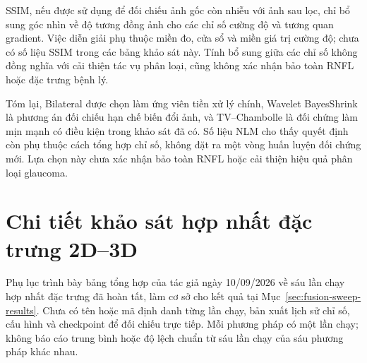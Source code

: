 \documentclass[14pt,a4paper,oneside]{extreport}
\begin{document}
SSIM, nếu được sử dụng để đối chiếu ảnh gốc còn nhiễu với ảnh sau lọc,
chỉ bổ sung góc nhìn về độ tương đồng ảnh cho các chỉ số cường độ và
tương quan gradient. Việc diễn giải phụ thuộc miền đo, cửa sổ và miền
giá trị cường độ; chưa có số liệu SSIM trong các bảng khảo sát này.
Tính bổ sung giữa các chỉ số không đồng nghĩa với cải thiện tác vụ
phân loại, cũng không xác nhận bảo toàn RNFL hoặc đặc trưng bệnh lý.

Tóm lại, Bilateral được chọn làm ứng viên tiền xử lý chính,
Wavelet BayesShrink là phương án đối chiếu hạn chế biến đổi ảnh,
và TV--Chambolle là đối chứng làm mịn mạnh có điều kiện trong khảo sát
đã có. Số liệu NLM cho thấy quyết định còn phụ thuộc cách tổng hợp
chỉ số, không đặt ra một vòng huấn luyện đối chứng mới. Lựa chọn này chưa xác nhận bảo toàn RNFL hoặc cải thiện
hiệu quả phân loại glaucoma.

\FloatBarrier


\chapter{Chi tiết khảo sát hợp nhất đặc trưng 2D--3D}
\label{app:fusion-sweep}
Phụ lục trình bày bảng tổng hợp của tác giả ngày 10/09/2026 về sáu lần
chạy hợp nhất đặc trưng đã hoàn tất, làm cơ sở cho kết quả tại
Mục~\ref{sec:fusion-sweep-results}. Chưa có tên hoặc mã định danh
từng lần chạy, bản xuất lịch sử chỉ số, cấu hình và checkpoint để đối chiếu
trực tiếp. Mỗi phương pháp có một lần chạy; không báo cáo trung bình
hoặc độ lệch chuẩn từ sáu lần chạy của sáu phương pháp khác nhau.
\end{document}
